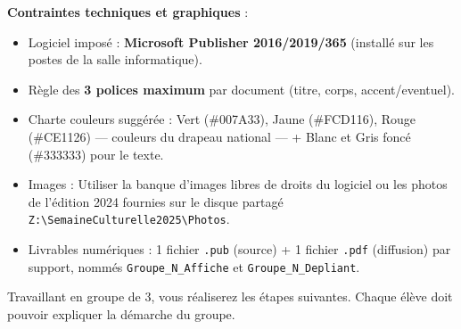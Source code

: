 \documentclass[11pt]{article}
\newcounter{popsec}
\newcounter{popsub}
\newcommand{\courssub}[1]{%
  \stepcounter{popsub}%
  \par\vspace{9pt}\noindent{\popxbold\fontsize{11.5}{13}\selectfont\color{popink}{\color{poporange}\thepopsec.\thepopsub}\hspace{6pt}#1}\par\nopagebreak\vspace{4pt}
}
\begin{document}
\textbf{Contraintes techniques et graphiques} :
\begin{itemize}
    \item Logiciel imposé : \textbf{Microsoft Publisher 2016/2019/365} (installé sur les postes de la salle informatique).
    \item Règle des \textbf{3 polices maximum} par document (titre, corps, accent/eventuel).
    \item Charte couleurs suggérée : Vert (\#007A33), Jaune (\#FCD116), Rouge (\#CE1126) — couleurs du drapeau national — + Blanc et Gris foncé (\#333333) pour le texte.
    \item Images : Utiliser la banque d'images libres de droits du logiciel ou les photos de l'édition 2024 fournies sur le disque partagé \texttt{Z:\textbackslash SemaineCulturelle2025\textbackslash Photos}.
    \item Livrables numériques : 1 fichier \texttt{.pub} (source) + 1 fichier \texttt{.pdf} (diffusion) par support, nommés \texttt{Groupe\_N\_Affiche} et \texttt{Groupe\_N\_Depliant}.
\end{itemize}

\courssub{Consignes}
Travaillant en groupe de 3, vous réaliserez les étapes suivantes. Chaque élève doit pouvoir expliquer la démarche du groupe.
\end{document}
